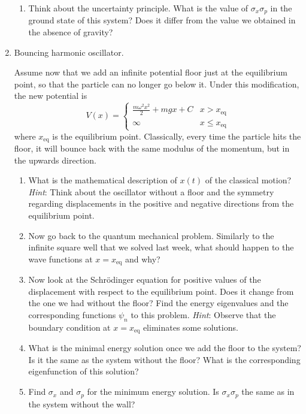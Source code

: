 \documentclass[../psets.tex]{subfiles}
\begin{document}
\begin{enumerate}
\begin{enumerate}
        \item Think about the uncertainty principle. What is the value of $\sigma_x\sigma_p$ in the ground state of this system? Does it differ from the value we obtained in the absence of gravity?
    \end{enumerate}
    \item Bouncing harmonic oscillator.\par
    Assume now that we add an infinite potential floor just at the equilibrium point, so that the particle can no longer go below it. Under this modification, the new potential is
    \begin{equation}
        V(x) =
        \begin{cases}
            \frac{m\omega^2x^2}{2}+mgx+C & x>x_\text{eq}\\
            \infty & x\leq x_\text{eq}
        \end{cases}
    \end{equation}
    where $x_\text{eq}$ is the equilibrium point. Classically, every time the particle hits the floor, it will bounce back with the same modulus of the momentum, but in the upwards direction.
    \begin{enumerate}
        \item What is the mathematical description of $x(t)$ of the classical motion? \emph{Hint}: Think about the oscillator without a floor and the symmetry regarding displacements in the positive and negative directions from the equilibrium point.
        \item Now go back to the quantum mechanical problem. Similarly to the infinite square well that we solved last week, what should happen to the wave functions at $x=x_\text{eq}$ and why?
        \item Now look at the Schr\"{o}dinger equation for positive values of the displacement with respect to the equilibrium point. Does it change from the one we had without the floor? Find the energy eigenvalues and the corresponding functions $\psi_n$ to this problem. \emph{Hint}: Observe that the boundary condition at $x=x_\text{eq}$ eliminates some solutions.
        \item What is the minimal energy solution once we add the floor to the system? Is it the same as the system without the floor? What is the corresponding eigenfunction of this solution?
        \item Find $\sigma_x$ and $\sigma_p$ for the minimum energy solution. Is $\sigma_x\sigma_p$ the same as in the system without the wall?

\end{enumerate}
\end{enumerate}
\end{document}
